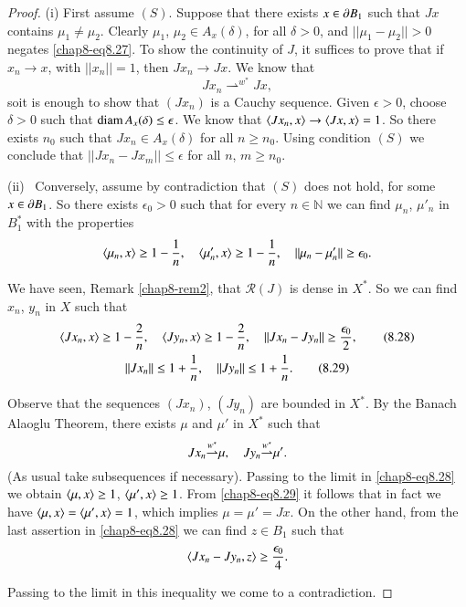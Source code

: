 \begin{proof}
(i) First assume $(S)$. Suppose that there exists $x\in \partial B_{1}$ such
  that $Jx$ contains $\mu_{1}\neq \mu_{2}$. Clearly $\mu_{1}$,
  $\mu_{2}\in A_{x}(\delta)$, for all $\delta>0$, and
  $||\mu_{1}-\mu_{2}||>0$ negates \eqref{chap8-eq8.27}. To show the
  continuity of $J$, it suffices to prove that if $x_{n}\to x$, with
  $||x_{n}||=1$, then $Jx_{n}\to Jx$. We know that
$$
Jx_{n}\displaystyle{\mathop{\rightharpoonup}^{w^{*}}}Jx,
$$
so\pageoriginale it is enough to show that $(Jx_{n})$ is a Cauchy
sequence. Given $\epsilon>0$, choose $\delta>0$ such that $\operatorname{diam}
A_{x}(\delta)\leq \epsilon$. We know that $\langle Jx_{n},x\rangle\to \langle
Jx,x\rangle=1$. So there exists $n_{0}$ such that $Jx_{n}\in
A_{x}(\delta)$ for all $n\geq n_{0}$. Using condition $(S)$ we
conclude that $||Jx_{n}-Jx_{m}||\leq \epsilon$ for all $n$, $m\geq
n_{0}$.

(ii)~ Conversely, assume by contradiction that $(S)$ does not hold,
for some $x\in \partial B_{1}$. So there exists $\epsilon_{0}>0$ such that
for every $n\in \mathbb{N}$ we can find $\mu_{n}$, $\mu'_{n}$ in
$B^{*}_{1}$ with the properties 
$$
\langle \mu_{n},x\rangle\geq 1-\frac{1}{n},\quad \langle \mu'_{n},x\rangle \geq
1-\frac{1}{n},\quad ||\mu_{n}-\mu'_{n}||\geq \epsilon_{0}. 
$$

We have seen, Remark \ref{chap8-rem2}, that $\mathcal{R}(J)$ is dense
in $X^{*}$. So we can find $x_{n}$, $y_{n}$ in $X$ such that
\begin{gather*}
\langle Jx_{n},x\rangle\geq 1-\frac{2}{n},\quad \langle Jy_{n},x\rangle\geq
1-\frac{2}{n},\quad ||Jx_{n}-Jy_{n}||\geq
\frac{\epsilon_{0}}{2},\tag{8.28}\label{chap8-eq8.28}\\ 
||Jx_{n}||\leq 1+\frac{1}{n},\quad ||Jy_{n}||\leq
1+\frac{1}{n}.\tag{8.29}\label{chap8-eq8.29} 
\end{gather*}

Observe that the sequences $(Jx_{n})$, $(Jy_{n})$ are bounded in
$X^{*}$. By the Banach Alaoglu Theorem, there exists $\mu$ and $\mu'$
in $X^{*}$ such that
$$
Jx_{n}\displaystyle{\mathop{\rightharpoonup}^{w^{*}}}\mu,\quad
Jy_{n}\displaystyle{\mathop{\rightharpoonup}^{w^{*}}}\mu'. 
$$
(As usual take subsequences if necessary). Passing to the limit in
\eqref{chap8-eq8.28} we obtain $\langle \mu,x\rangle\geq 1$, $\langle
\mu',x\rangle\geq 1$. From \eqref{chap8-eq8.29} it follows that in fact we
have $\langle \mu,x\rangle=\langle \mu',x\rangle=1$, which implies $\mu=\mu'=Jx$. On
the other hand, from the last assertion in \eqref{chap8-eq8.28} we can
find $z\in B_{1}$ such that
$$
\langle Jx_{n}-Jy_{n},z\rangle \geq \frac{\epsilon_{0}}{4}.
$$

Passing to the limit in this inequality we come to a contradiction.  
\end{proof}

